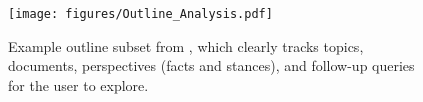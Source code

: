 \begin{figure}[!t]
    \centering
    \texttt{[image: figures/Outline\_Analysis.pdf]}
    \vspace{-4ex}
    \caption{\label{fig:outline} Example outline subset from \model, which clearly tracks topics, documents, perspectives (facts and stances), and follow-up queries for the user to explore. }
\end{figure}
